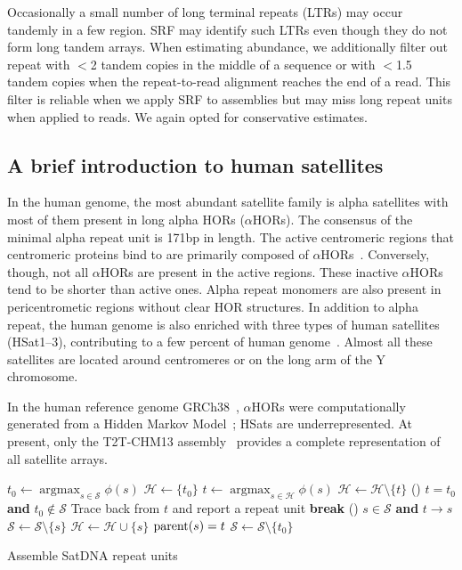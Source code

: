 \documentclass{bioinfo}
\DeclareMathOperator*{\argmax}{argmax}
\begin{document}
Occasionally a small number of long terminal repeats (LTRs) may occur tandemly
in a few region. SRF may identify such LTRs even though they do not form long
tandem arrays. When estimating abundance, we additionally filter out repeat
with $<$2 tandem copies in the middle of a sequence or with $<$1.5 tandem
copies when the repeat-to-read alignment reaches the end of a read. This filter
is reliable when we apply SRF to assemblies but may miss long repeat units when
applied to reads. We again opted for conservative estimates.

\subsection{A brief introduction to human satellites}

In the human genome, the most abundant satellite family is alpha satellites
with most of them present in long alpha HORs ($\alpha$HORs). The
consensus of the minimal alpha repeat unit is 171bp in length. The active
centromeric regions that centromeric proteins bind to are primarily
composed of $\alpha$HORs~\citep{Altemose:2022tv}. Conversely, though, not all
$\alpha$HORs are present in the active regions. These inactive $\alpha$HORs
tend to be shorter than active ones. Alpha repeat monomers are also present in
pericentrometic regions without clear HOR structures. In addition to alpha
repeat, the human genome is also enriched with three types of human satellites
(HSat1--3), contributing to a few percent of human
genome~\citep{Altemose:2022vw}. Almost all these satellites are located around
centromeres or on the long arm of the Y chromosome.

In the human reference genome GRCh38~\citep{Schneider:2017aa}, $\alpha$HORs
were computationally generated from a Hidden Markov Model~\citep{Miga:2014aa};
HSats are underrepresented. At present, only the T2T-CHM13
assembly~\citep{Nurk:2022up} provides a complete representation of all
satellite arrays.

\begin{algorithm}[tb]
\DontPrintSemicolon
\footnotesize
{}
\BlankLine
{} {
	$t_0\gets\argmax_{s\in\mathcal{S}}\phi(s)$
	$\mathcal{H}\gets\{t_0\}$\;
	 {
		$t\gets\argmax_{s\in\mathcal{H}}\phi(s)$
		$\mathcal{H}\gets\mathcal{H}\setminus\{t\}$
		\If () {$t=t_0$ {\bf and} $t_0\not\in\mathcal{S}$} {
			Trace back from $t$ and report a repeat unit\;
			{\bf break}\;
		}
		\For () {$s\in\mathcal{S}$ {\bf and} $t\to s$} {
			$\mathcal{S}\gets\mathcal{S}\setminus\{s\}$\;
			$\mathcal{H}\gets\mathcal{H}\cup\{s\}$
			${\rm parent}(s)=t$
		}
	}
	$\mathcal{S}\gets\mathcal{S}\setminus\{t_0\}$
}
\caption{Assemble SatDNA repeat units}\label{alg:srf}
\end{algorithm}
\end{document}

